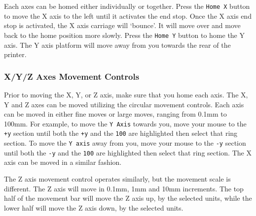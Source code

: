 Each axes can be homed either individually or together. Press the \texttt{Home X} button to move the X axis to the left until it activates the end stop. Once the X axis end stop is activated, the X axis carriage will `bounce'. It will move over and move back to the home position more slowly. Press the \texttt{Home Y} button to home the Y axis. The Y axis platform will move away from you towards the rear of the printer. %

\subsubsection{X/Y/Z Axes Movement Controls}
Prior to moving the X, Y, or Z axis, make sure that you home each axis. The X, Y and Z axes can be moved utilizing the circular movement controls. Each axis can be moved in either fine moves or large moves, ranging from 0.1mm to 100mm.  For example, to move the \texttt{Y Axis} towards you, move your mouse to the \texttt{+y} section until both the \texttt{+y} and the \texttt{100} are highlighted then select that ring section. To move the \texttt{Y axis} away from you, move your mouse to the \texttt{-y} section until both the \texttt{-y} and the \texttt{100} are highlighted then select that ring section. The X axis can be moved in a similar fashion.

The Z axis movement control operates similarly, but the movement scale is different. The Z axis will move in 0.1mm, 1mm and 10mm increments. The top half of the movement bar will move the Z axis up, by the selected units, while the lower half will move the Z axis down, by the selected units.




